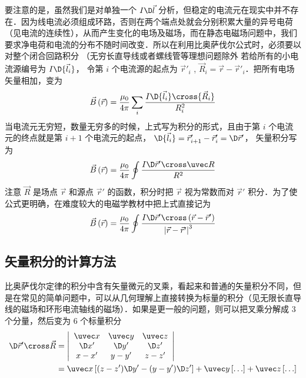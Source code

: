 要注意的是，虽然我们是对单独一个 $I\D \vec l$ 分析，但稳定的电流元在现实中并不存在．因为线电流必须组成环路，否则在两个端点处就会分别积累大量的异号电荷（见电流的连续性），从而产生变化的电场及磁场，而在静态电磁场问题中，我们要求净电荷和电流的分布不随时间改变．所以在利用比奥萨伐尔公式时，必须要以对整个闭合回路积分 （无穷长直导线或者螺线管等理想问题除外%
若给所有的小电流源编号为 $I\D {\vec l_i}$， 令第 $i$ 个电流源的起点为 ${\vec r'_i}$ , ${\vec R_i} = \vec r - {\vec r'_i}$．把所有电场矢量相加，变为
\begin{equation}
\vec B\left( {\vec r} \right) = \frac{{{\mu _0}}}{{4\pi }}\sum\limits_i {\frac{{I\D {{\vec l}_i} \cross {{\vec R}_i}}}{{R_i^2}}} 
\end{equation}
当电流元无穷短，数量无穷多的时候，上式写为积分的形式，且由于第 $i$ 个电流元的终点就是第 $i+1$ 个电流元的起点， $\D {\vec l_i} = {\vec r'_{i + 1}} - {\vec r'_i} = \D \vec r'$， 矢量积分写为
\begin{equation}
\vec B\left( {\vec r} \right) = \frac{{{\mu _0}}}{{4\pi }}\oint {\frac{{I\D \vec r' \cross \uvec R}}{{{R^2}}}} 
\end{equation}
注意 $\vec R$ 是场点 $\vec r$ 和源点 $\vec r'$ 的函数，积分时把 $\vec r$ 视为常数而对 $\vec r'$ 积分．为了使公式更明确，在难度较大的电磁学教材中把上式直接记为
\begin{equation}\label{Biotsavart_eq1}
\vec B\left( {\vec r} \right) = \frac{{{\mu _0}}}{{4\pi }}\oint {\frac{{I\D \vec r' \cross \left( {\vec r - \vec r'} \right)}}{{{{\left| {\vec r - \vec r'} \right|}^3}}}}  
\end{equation}

\subsection{矢量积分的计算方法}
比奥萨伐尔定律的积分中含有矢量微元的叉乘，看起来和普通的矢量积分不同，但是在常见的简单问题中，可以从几何理解上直接转换为标量的积分（见无限长直导线的磁场和环形电流轴线的磁场）．如果是更一般的问题，则可以把叉乘分解成 3 个分量，然后变为 6 个标量积分
\begin{equation}
\begin{split}
\D \vec r' \cross \vec R &= \left| {\begin{array}{*{20}{c}}
{\uvec x}&{\uvec y}&{\uvec z}\\
{\D x'}&{\D y'}&{\D z'}\\
{x - x'}&{y - y'}&{z - z'}
\end{array}} \right| \\
&= \uvec x\left[ {(z - z')\D y' - (y - y')\D z'} \right] + \uvec y\left[ {\dots} \right] + \uvec z\left[ {\dots} \right]
\end{split}
\end{equation} 

